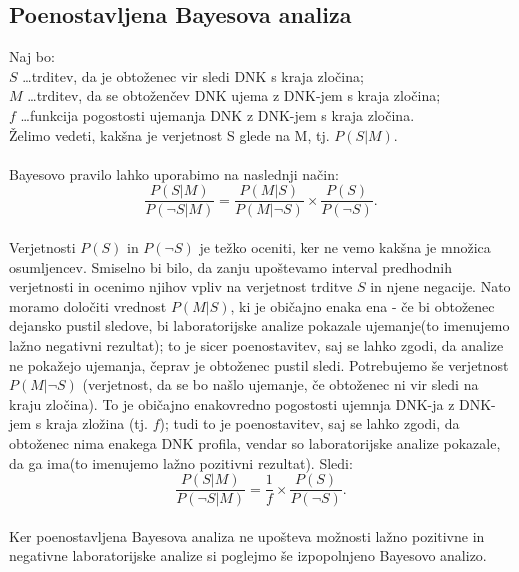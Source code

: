 \documentclass[12pt,a4paper]{amsart}
\theoremstyle{definition} %
\theoremstyle{plain} %
\begin{document}
\subsection{Poenostavljena Bayesova analiza}
Naj bo:\\
$S$ \dots trditev, da je obtoženec vir sledi DNK s kraja zločina; \\
$M$ \dots trditev, da se obtoženčev DNK ujema z DNK-jem s kraja zločina; \\
$f$ \dots funkcija pogostosti ujemanja DNK z DNK-jem s kraja zločina. \\
Želimo vedeti, kakšna je verjetnost S glede na M, tj. $P(S \lvert M)$. \\\\
Bayesovo pravilo lahko uporabimo na naslednji način:
\[
    \frac{P(S \lvert M)}{P(\neg S \lvert M)} = \frac{P(M \lvert S)}{P(M \lvert \neg S)} \times \frac{P(S)}{P(\neg S)}.
\]\\
Verjetnosti $P(S)$ in $P(\neg S)$ je težko oceniti, ker ne vemo kakšna je množica osumljencev. Smiselno bi bilo, da zanju upoštevamo interval 
predhodnih verjetnosti in ocenimo njihov vpliv na verjetnost trditve $S$ in njene negacije. Nato moramo določiti vrednost $P(M \lvert S)$, ki 
je običajno enaka ena - če bi obtoženec dejansko pustil sledove, bi laboratorijske analize pokazale ujemanje(to imenujemo lažno 
negativni rezultat); to je sicer poenostavitev, saj se lahko zgodi, da analize ne pokažejo ujemanja, čeprav je obtoženec pustil sledi. 
Potrebujemo še verjetnost $P(M \lvert \neg S)$ (verjetnost, da se bo našlo ujemanje, če obtoženec ni vir sledi na kraju zločina). To je 
običajno enakovredno pogostosti ujemnja DNK-ja z DNK-jem s kraja zložina (tj. $f$); tudi to je poenostavitev, saj se lahko zgodi, da 
obtoženec nima enakega DNK profila, vendar so laboratorijske analize pokazale, da ga ima(to imenujemo lažno pozitivni rezultat).
Sledi:
\[
    \frac{P(S \lvert M)}{P(\neg S \lvert M)} = \frac{1}{f} \times \frac{P(S)}{P(\neg S)}.
\]\\
Ker poenostavljena Bayesova analiza ne upošteva možnosti lažno pozitivne in negativne laboratorijske analize si poglejmo še izpopolnjeno 
Bayesovo analizo.

\end{document}
